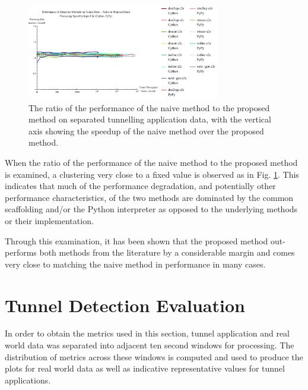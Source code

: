 \documentclass{llncs}
\begin{document}
\begin{figure}[h] \centering
\includegraphics[width=0.75\textwidth]{../figures/ppia-naive2proposed.pdf}
\caption[Performance Ratio of the Naive Method to the Proposed Method on Tunnel
Data by Python Interpreter]{The ratio of the performance of the naive method to
the proposed method on separated tunnelling application data, with the vertical
axis showing the speedup of the naive method over the proposed method.}
\label{ppia-naive2proposed} \end{figure}

When the ratio of the performance of the naive method to the proposed method is
examined, a clustering very close to a fixed value is observed as in Fig.
\ref{ppia-naive2proposed}. This indicates that much of the performance
degradation, and potentially other performance characteristics, of the two
methods are dominated by the common scaffolding and/or the Python interpreter as
opposed to the underlying methods or their implementation.

Through this examination, it has been shown that the proposed method
out-performs both methods from the literature by a considerable margin and comes
very close to matching the naive method in performance in many cases.

\section{Tunnel Detection Evaluation}
\label{chap-evaluation}
\label{tunnel-detection-performance}

In order to obtain the metrics used in this section, tunnel application and real
world data was separated into adjacent ten second windows for processing. The
distribution of metrics across these windows is computed and used to produce the
plots for real world data as well as indicative representative values for tunnel
applications.
\end{document}
